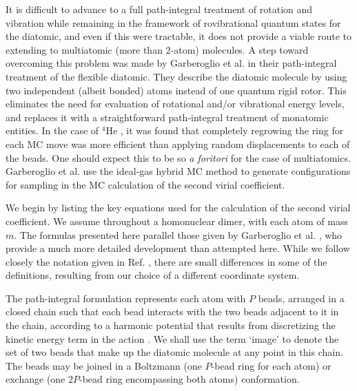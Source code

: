         It is difficult to advance to a full path-integral treatment of rotation and vibration while remaining in the framework of rovibrational quantum states for the diatomic, and even if this were tractable, it does not provide a viable route to extending to multiatomic (more than 2-atom) molecules. A step toward overcoming this problem was made by Garberoglio et al. \cite{Garberoglio2014} in their path-integral treatment of the flexible diatomic. They describe the diatomic molecule by using two independent (albeit bonded) atoms instead of one quantum rigid rotor. This eliminates the need for evaluation of rotational and/or vibrational energy levels, and replaces it with a straightforward path-integral treatment of monatomic entities. In the case of $^4$He \cite{Shaul2012}, it was found that completely regrowing the ring for each MC move was more efficient than applying random displacements to each of the beads. One should expect this to be so \emph{a foritori} for the case of multiatomics. Garberoglio et al. \cite{Garberoglio2014} use the ideal-gas hybrid MC method to generate configurations for sampling in the MC calculation of the second virial coefficient.

        We begin by listing the key equations used for the calculation of the second virial coefficient. We assume throughout a homonuclear dimer, with each atom of mass $m$. The formulas presented here parallel those given by Garberoglio et al. \cite{Garberoglio2014}, who provide a much more detailed development than attempted here. While we follow closely the notation given in Ref. \cite{Garberoglio2014}, there are small differences in some of the definitions, resulting from our choice of a different coordinate system.

        The path-integral formulation represents each atom with $P$ beads, arranged in a closed chain such that each bead interacts with the two beads adjacent to it in the chain, according to a harmonic potential that results from discretizing the kinetic energy term in the action \cite{Feynman}. We shall use the term `image' to denote the set of two beads that make up the diatomic molecule at any point in this chain. The beads may be joined in a Boltzmann (one $P$-bead ring for each atom) or exchange (one $2P$-bead ring encompassing both atoms) conformation.

